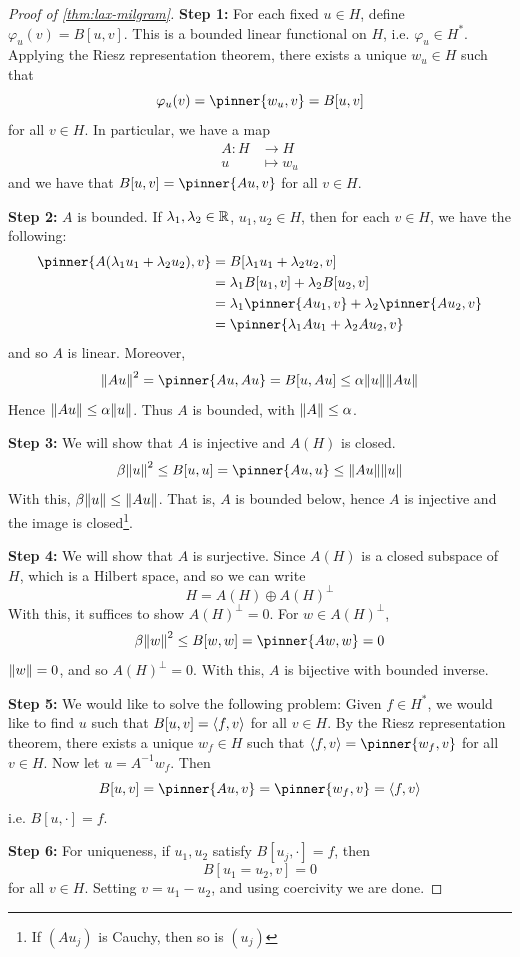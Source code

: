 \documentclass{article}
\begin{document}
\begin{proof}
    [Proof of \cref{thm:lax-milgram}]

    \textbf{Step 1:} For each fixed \(u \in H\), define \(\varphi_u(v) = B[u, v]\). This is a bounded linear functional on \(H\), i.e. \(\varphi_u \in H^*\). Applying the Riesz representation theorem, there exists a unique \(w_u \in H\) such that
    \[\varphi_u(v) = \pinner{w_u, v} = B[u, v]\]
    for all \(v \in H\). In particular, we have a map
    \begin{align*}
        A : H &\to H \\
        u &\mapsto w_u
    \end{align*}
    and we have that \(B[u, v] = \pinner{Au, v}\) for all \(v \in H\).

    \textbf{Step 2:} \(A\) is bounded. If \(\lambda_1, \lambda_2 \in \mathbb{R}\), \(u_1, u_2 \in H\), then for each \(v \in H\), we have the following:
    \begin{align*}
        \pinner{A(\lambda_1 u_1 + \lambda_2 u_2), v} &= B[\lambda_1u_1 + \lambda_2 u_2, v] \\
        &=\lambda_1B[u_1, v] + \lambda_2B[u_2, v] \\
        &= \lambda_1\pinner{Au_1, v} + \lambda_2\pinner{Au_2, v} \\
        &= \pinner{\lambda_1 Au_1 + \lambda_2 Au_2, v}
    \end{align*}
    and so \(A\) is linear. Moreover,
    \[\norm{Au}^2 = \pinner{Au, Au} = B[u, Au] \le \alpha\norm{u}\norm{Au}\]
    Hence \(\norm{Au} \le \alpha\norm{u}\). Thus \(A\) is bounded, with \(\norm{A} \le \alpha\).

    \textbf{Step 3:} We will show that \(A\) is injective and \(A(H)\) is closed.
    \[\beta\norm{u}^2 \le B[u, u] = \pinner{Au, u} \le \norm{Au}\norm{u}\]
    With this, \(\beta\norm{u} \le \norm{Au}\). That is, \(A\) is bounded below, hence \(A\) is injective and the image is closed\footnote{If \((Au_j)\) is Cauchy, then so is \((u_j)\)}.

    \textbf{Step 4:} We will show that \(A\) is surjective. Since \(A(H)\) is a closed subspace of \(H\), which is a Hilbert space, and so we can write
    \[H = A(H) \oplus A(H)^\perp\]
    With this, it suffices to show \(A(H)^\perp = 0\). For \(w \in A(H)^\perp\),
    \[\beta\norm{w}^2 \le B[w, w] = \pinner{Aw, w} = 0\]
    \(\norm{w} = 0\), and so \(A(H)^\perp = 0\). With this, \(A\) is bijective with bounded inverse.

    \textbf{Step 5:} We would like to solve the following problem: Given \(f \in H^*\), we would like to find \(u\) such that \(B[u, v] = \left\langle f, v \right\rangle\) for all \(v \in H\). By the Riesz representation theorem, there exists a unique \(w_f \in H\) such that \(\inner{f, v} = \pinner{w_f, v}\) for all \(v \in H\). Now let \(u = A^{-1}w_f\). Then
    \[B[u, v] = \pinner{Au, v} = \pinner{w_f, v} = \inner{f, v}\]
    i.e. \(B[u, \cdot] = f\).

    \textbf{Step 6:} For uniqueness, if \(u_1, u_2\) satisfy \(B[u_j, \cdot] = f\), then
    \[B[u_1 = u_2, v] = 0\]
    for all \(v \in H\). Setting \(v = u_1 - u_2\), and using coercivity we are done.
\end{proof}
\end{document}
